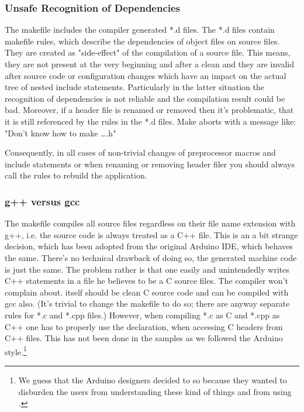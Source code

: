 \subsubsection{Unsafe Recognition of Dependencies}

The makefile includes the compiler generated *.d files. The *.d files
contain makefile rules, which describe the dependencies of object files on
source files. They are created as "side-effect" of the compilation of a
source file. This means, they are not present at the very beginning and
after a clean and they are invalid after source code or configuration
changes which have an impact on the actual tree of nested include
statements. Particularly in the latter situation the recognition of
dependencies is not reliable and the compilation result could be bad.
Moreover, if a header file is renamed or removed then it's problematic,
that it is still referenced by the rules in the *.d files. Make aborts
with a message like: "Don't know how to make \ldots.h"

Consequently, in all cases of non-trivial changes of preprocessor macros
and include statements or when renaming or removing header filer you
should always call the rules to rebuild the application.

\subsubsection{g++ versus gcc}

The makefile compiles all source files regardless on their file name
extension with g++, i.e. the source code is always treated as a C++ file.
This is an a bit strange decision, which has been adopted from the
original Arduino IDE, which behaves the same. There's no technical
drawback of doing so, the generated machine code is just the same. The
problem rather is that one easily and unintendedly writes C++ statements
in a file he believes to be a C source files. The compiler won't complain
about. \rtos{} itself should be clean C source code and can be compiled
with gcc also. (It's trivial to change the makefile to do so; there are
anyway separate rules for *.c and *.cpp files.) However, when compiling
*.c as C and *.cpp as C++ one has to properly use the 
declaration, when accessing C headers from C++ files. This has not been
done in the \rtos{} samples as we followed the Arduino style.\footnote{We
guess that the Arduino designers decided to so because they wanted to
disburden the users from understanding these kind of things and from using
.}


